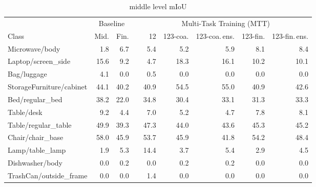 \begin{table}[!h]

\caption{middle level mIoU}
\centering
\begin{tabular}{lrrrrrrrr}
\toprule
 &  \multicolumn{2}{c}{Baseline} && \multicolumn{5}{c}{Multi-Task Training (MTT)} \\
 \cmidrule{2-3}
 \cmidrule{5-9}
Class 			  &  	 Mid. &  				Fin. &&  	12 &  		123-coa. &  		123-coa.\,ens. &  	  123-fin. &  123-fin.\,ens. \\
\midrule
Microwave/body           &              1.8 &                  6.7 &&     5.4 &             5.2 &                     5.9 &           8.1 &                   8.4 \\
Laptop/screen\_side       &             15.6 &                  9.2 &&     4.7 &            18.3 &                    16.1 &          10.2 &                  10.1 \\
Bag/luggage              &              4.1 &                  0.0 &&     0.5 &             0.0 &                     0.0 &           0.0 &                   0.0 \\
StorageFurniture/cabinet &             44.1 &                 40.2 &&    40.9 &            54.5 &                    55.0 &          40.9 &                  42.6 \\
Bed/regular\_bed          &             38.2 &                 22.0 &&    34.8 &            30.4 &                    33.1 &          31.3 &                  33.3 \\
Table/desk               &              9.2 &                  4.4 &&     7.0 &             5.2 &                     4.7 &           7.8 &                   8.1 \\
Table/regular\_table      &             49.9 &                 39.3 &&    47.3 &            44.0 &                    43.6 &          45.3 &                  45.2 \\
Chair/chair\_base         &             58.0 &                 45.9 &&    53.7 &            45.9 &                    41.8 &          54.2 &                  48.4 \\
Lamp/table\_lamp          &              1.9 &                  5.3 &&    14.4 &             3.7 &                     5.4 &           2.9 &                   4.5 \\
Dishwasher/body          &              0.0 &                  0.2 &&     0.0 &             0.2 &                     0.2 &           0.0 &                   0.0 \\
TrashCan/outside\_frame   &              0.0 &                  0.0 &&     1.4 &             0.0 &                     0.0 &           0.0 &                   0.0 \\

\end{tabular}
\end{table}
